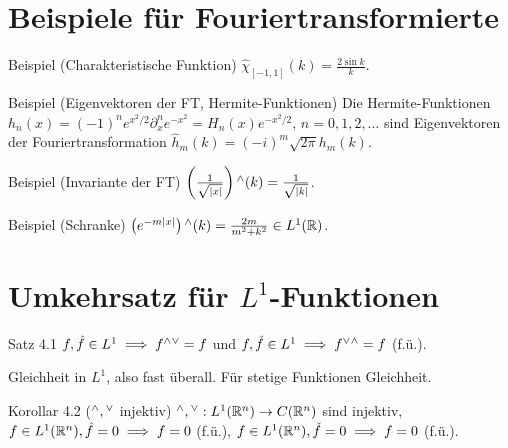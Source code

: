 \section{Beispiele für Fouriertransformierte}

\begin{namedtheorem}{Beispiel (Charakteristische Funktion)}
  $\hat{\chi}_{[-1,1]}(k)=\frac{2\sin k}{k}$.
\end{namedtheorem}


\begin{namedtheorem}{Beispiel (Eigenvektoren der FT, Hermite-Funktionen)}
  Die Hermite-Funktionen $h_n(x)=(-1)^ne^{x^2/2}\partial_x^ne^{-x^2}=H_n(x)e^{-x^2/2}$, $n=0,1,2,
  \ldots$ sind Eigenvektoren der Fouriertransformation $\hat{h}_m(k)=(-i)^m\sqrt{2\pi}h_m(k)$.
\end{namedtheorem}

\begin{namedtheorem}{Beispiel (Invariante der FT)}
	$\left(\frac1{\sqrt{|x|}}\right){}^{\wedge}(k) = \frac1{\sqrt{|k|}}$.
\end{namedtheorem}

\begin{namedtheorem}{Beispiel (Schranke)}
  $\left(e^{-m|x|}\right){}^{\wedge}(k)=\frac{2m}{m^2+k^2}\in L^1(\mathbb{R})$.
\end{namedtheorem}

\section{Umkehrsatz für $L^1$-Funktionen}

\begin{namedtheorem}{Satz 4.1}
  $f,\hat{f}\in L^1 \implies f{}^{\wedge}{}^{\vee} = f$ und $f,\check{f}\in L^1 \implies f{}^{\vee}{}^{\wedge} = f$ (f.ü.).
\end{namedtheorem}

Gleichheit in $L^1$, also fast überall. Für stetige Funktionen Gleichheit.

\begin{namedtheorem}{Korollar 4.2 (${}^{\wedge},{}^{\vee}$ injektiv)}
  ${}^{\wedge},{}^{\vee}:L^1(\mathbb{R}^n)\rightarrow C(\mathbb{R}^n)$ sind injektiv,
  $f\in L^1(\mathbb{R}^n), \hat{f} = 0 \implies f = 0$ (f.ü.),
  $f\in L^1(\mathbb{R}^n), \check{f} = 0 \implies f = 0$ (f.ü.).
\end{namedtheorem}

